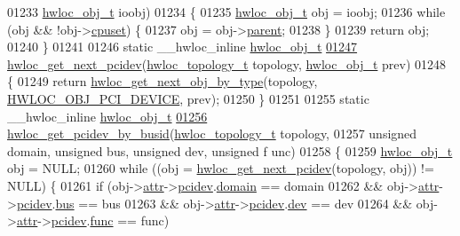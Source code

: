 \begin{DoxyCode}
01233                               \hyperlink{a00016}{hwloc_obj_t} ioobj)
01234 \{
01235   \hyperlink{a00016}{hwloc_obj_t} obj = ioobj;
01236   \textcolor{keywordflow}{while} (obj && !obj->\hyperlink{a00016_a67925e0f2c47f50408fbdb9bddd0790f}{cpuset}) \{
01237     obj = obj->\hyperlink{a00016_adc494f6aed939992be1c55cca5822900}{parent};
01238   \}
01239   \textcolor{keywordflow}{return} obj;
01240 \}
01241 
01246 \textcolor{keyword}{static} \_\_hwloc\_inline \hyperlink{a00016}{hwloc_obj_t}
\hypertarget{a00031_source_l01247}{}\hyperlink{a00064_gad6e1ed122ef3b6e098538d75acd5e3f6}{01247} \hyperlink{a00064_gad6e1ed122ef3b6e098538d75acd5e3f6}{hwloc_get_next_pcidev}(\hyperlink{a00039_ga9d1e76ee15a7dee158b786c30b6a6e38}{hwloc_topology_t} topology, \hyperlink{a00016}{hwloc_obj_t} prev)
01248 \{
01249   \textcolor{keywordflow}{return} \hyperlink{a00053_ga5f08ceb69375341e73563cfe2e77534e}{hwloc_get_next_obj_by_type}(topology, \hyperlink{a00041_ggacd37bb612667dc437d66bfb175a8dc55a5d8117a54df1fbd3606ab19e42cb0ea9}{HWLOC_OBJ_PCI_DEVICE}, prev);
01250 \}
01251 
01255 \textcolor{keyword}{static} \_\_hwloc\_inline \hyperlink{a00016}{hwloc_obj_t}
\hypertarget{a00031_source_l01256}{}\hyperlink{a00064_ga546e1d690c63fb24177f3013ed78ceb1}{01256} \hyperlink{a00064_ga546e1d690c63fb24177f3013ed78ceb1}{hwloc_get_pcidev_by_busid}(\hyperlink{a00039_ga9d1e76ee15a7dee158b786c30b6a6e38}{hwloc_topology_t} topology,
01257                           \textcolor{keywordtype}{unsigned} domain, \textcolor{keywordtype}{unsigned} bus, \textcolor{keywordtype}{unsigned} dev, \textcolor{keywordtype}{unsigned} f
      unc)
01258 \{
01259   \hyperlink{a00016}{hwloc_obj_t} obj = NULL;
01260   \textcolor{keywordflow}{while} ((obj = \hyperlink{a00064_gad6e1ed122ef3b6e098538d75acd5e3f6}{hwloc_get_next_pcidev}(topology, obj)) != NULL) \{
01261     \textcolor{keywordflow}{if} (obj->\hyperlink{a00016_accd40e29f71f19e88db62ea3df02adc8}{attr}->\hyperlink{a00017_a4203d713ce0f5beaa6ee0e9bdac70828}{pcidev}.\hyperlink{a00022_a8fba44988deb98613c1505a4019a34dc}{domain} == domain
01262         && obj->\hyperlink{a00016_accd40e29f71f19e88db62ea3df02adc8}{attr}->\hyperlink{a00017_a4203d713ce0f5beaa6ee0e9bdac70828}{pcidev}.\hyperlink{a00022_aae99e035e8d1387d7b8768aaa8eceb0a}{bus} == bus
01263         && obj->\hyperlink{a00016_accd40e29f71f19e88db62ea3df02adc8}{attr}->\hyperlink{a00017_a4203d713ce0f5beaa6ee0e9bdac70828}{pcidev}.\hyperlink{a00022_a3d70c84a12f7e93d14c8d47bf4fd9dc5}{dev} == dev
01264         && obj->\hyperlink{a00016_accd40e29f71f19e88db62ea3df02adc8}{attr}->\hyperlink{a00017_a4203d713ce0f5beaa6ee0e9bdac70828}{pcidev}.\hyperlink{a00022_a695f32df53f4ef728670bfcf31b74e0f}{func} == func)

\end{DoxyCode}
